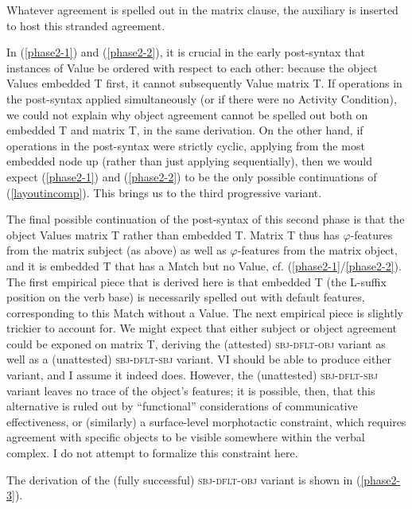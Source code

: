 \documentclass[output=paper
,modfonts
,nonflat]{langsci/langscibook}
\begin{document}
\noindent Whatever agreement is spelled out in the matrix clause, the auxiliary is inserted to host this stranded agreement. 

In (\ref{phase2-1}) and (\ref{phase2-2}), it is crucial in the early post-syntax that instances of Value be ordered with respect to each other: because the object Values embedded T first, it cannot subsequently Value matrix T. If operations in the post-syntax applied simultaneously (or if there were no Activity Condition), we could not explain why object agreement cannot be spelled out both on embedded T and matrix T, in the same derivation. On the other hand, if operations in the post-syntax were strictly cyclic, applying from the most embedded node up (rather than just applying sequentially), then we would expect (\ref{phase2-1}) and (\ref{phase2-2}) to be the only possible continuations of (\ref{layoutincomp}). This brings us to the third progressive variant.

The final possible continuation of the post-syntax of this second phase is that the object Values matrix T rather than embedded T. Matrix T thus has $\varphi$-features from the matrix subject (as above) as well as $\varphi$-features from the matrix object, and it is embedded T that has a Match but no Value, cf. (\ref{phase2-1}/\ref{phase2-2}). The first empirical piece that is derived here is that embedded T (the L-suffix position on the verb base) is necessarily spelled out with default features, corresponding to this Match without a Value. The next empirical piece is slightly trickier to account for. We might expect that either subject or object agreement could be exponed on matrix T, deriving the (attested) \textsc{sbj-dflt-obj} variant as well as a (unattested) \textsc{sbj-dflt-sbj} variant. VI should be able to produce either variant, and I assume it indeed does. However, the (unattested) \textsc{sbj-dflt-sbj} variant leaves no trace of the object's features; it is possible, then, that this alternative is ruled out by ``functional'' considerations of communicative effectiveness, or (similarly) a surface-level morphotactic constraint, which requires agreement with specific objects to be visible somewhere within the verbal complex. I do not attempt to formalize this constraint here.

The derivation of the (fully successful) \textsc{sbj-dflt-obj} variant is shown in (\ref{phase2-3}).\largerpage
\end{document}
